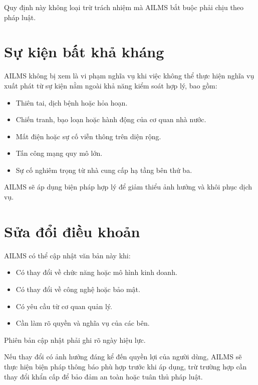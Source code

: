 \documentclass[12pt,a4paper]{article}
\begin{document}
Quy định này không loại trừ trách nhiệm mà AILMS bắt buộc phải chịu theo pháp luật.

\section{Sự kiện bất khả kháng}

AILMS không bị xem là vi phạm nghĩa vụ khi việc không thể thực hiện nghĩa vụ
xuất phát từ sự kiện nằm ngoài khả năng kiểm soát hợp lý, bao gồm:

\begin{itemize}
    \item Thiên tai, dịch bệnh hoặc hỏa hoạn.
    \item Chiến tranh, bạo loạn hoặc hành động của cơ quan nhà nước.
    \item Mất điện hoặc sự cố viễn thông trên diện rộng.
    \item Tấn công mạng quy mô lớn.
    \item Sự cố nghiêm trọng từ nhà cung cấp hạ tầng bên thứ ba.
\end{itemize}

AILMS sẽ áp dụng biện pháp hợp lý để giảm thiểu ảnh hưởng và khôi phục dịch vụ.

\section{Sửa đổi điều khoản}

AILMS có thể cập nhật văn bản này khi:

\begin{itemize}
    \item Có thay đổi về chức năng hoặc mô hình kinh doanh.
    \item Có thay đổi về công nghệ hoặc bảo mật.
    \item Có yêu cầu từ cơ quan quản lý.
    \item Cần làm rõ quyền và nghĩa vụ của các bên.
\end{itemize}

Phiên bản cập nhật phải ghi rõ ngày hiệu lực.

Nếu thay đổi có ảnh hưởng đáng kể đến quyền lợi của người dùng,
AILMS sẽ thực hiện biện pháp thông báo phù hợp trước khi áp dụng,
trừ trường hợp cần thay đổi khẩn cấp để bảo đảm an toàn hoặc tuân thủ pháp luật.

\end{document}

